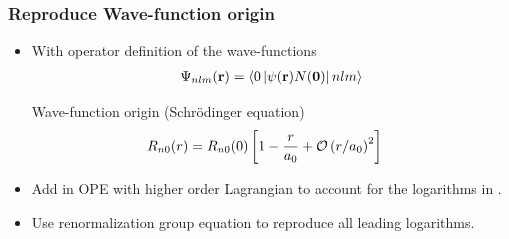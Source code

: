 \begin{frame}
  \frametitle{Reproduce Wave-function origin}



  \begin{itemize}
    \item With operator definition of the wave-functions
          \begin{align}
            \Psi_{nlm}({\bf r})=\left\langle 0\left\vert\psi({\bf r})N({\bf 0})\right\vert nlm \right\rangle
          \end{align}
          \begin{block}{\large Wave-function origin (Schr\"odinger equation)}
            \begin{align}
               & R_{n0}(r)= R_{n0}(0)
              \left[1-{r\over a_0}+{\mathcal O}\left(r/a_0\right)^2\right]
            \end{align}
          \end{block}
    \item Add  in OPE with higher order Lagrangian to account for the logarithms in .
    \item Use renormalization group equation to reproduce all leading logarithms.
  \end{itemize}

\end{frame}


